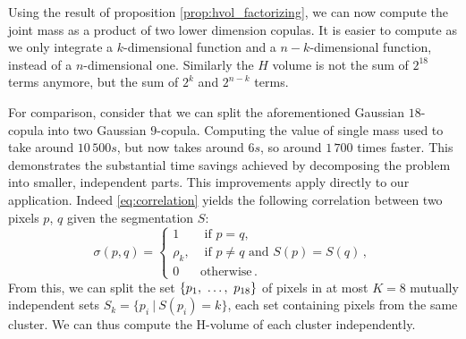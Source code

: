 Using the result of proposition \ref{prop:hvol_factorizing}, we can now compute the joint mass as a product of two lower dimension copulas. It is easier to compute as we only integrate a $k$-dimensional function and a $n-k$-dimensional function, instead of a $n$-dimensional one. Similarly the $H$ volume is not the sum of $2^{18}$ terms anymore, but the sum of $2^{k}$ and $2^{n-k}$ terms.

For comparison, consider that we can split the aforementioned Gaussian $18$-copula into two Gaussian $9$-copula. Computing the value of single mass used to take around $10\,500s$, but now takes around $6s$, so around $1\,700$ times faster. This demonstrates the substantial time savings achieved by decomposing the problem into smaller, independent parts. This improvements apply directly to our application. Indeed \cref{eq:correlation} yields the following correlation between two pixels $p$, $q$ given the segmentation $S$:
\begin{equation*}
    \sigma(p, q) =
    \begin{cases}
        1 &\text{ if }p=q,\\
        \rho_k, &\text{ if } p\ne q\text{ and }S(p)=S(q)\,, \\
        0 & \text{otherwise}\,.
    \end{cases}
\end{equation*}
From this, we can split the set $\{p_1 , ~\dots, ~ p_{18}\}$ of pixels in at most $K=8$ mutually independent sets $S_k = \{p_i~|~S(p_i)=k\}$, each set containing pixels from the same cluster. We can thus compute the H-volume of each cluster independently.

